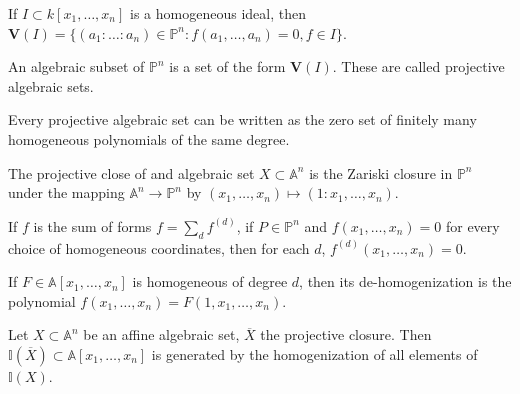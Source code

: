 \documentclass[crop=false,class=book,oneside]{standalone}
\begin{document}
                \begin{definition}
                    If $I\subset k[x_1,\hdots ,x_n]$ is a
                    homogeneous ideal, then
                    $\mathbf{V}(I)%
                     =\{(a_1:\hdots:a_{n})\in\mathbb{P}^{n}:%
                     f(a_{1},\hdots,a_{n})=0,f\in I\}$.
                \end{definition}
                \begin{definition}
                    An algebraic subset of $\mathbb{P}^{n}$ is a
                    set of the form $\mathbf{V}(I)$.
                    These are called projective algebraic sets.
                \end{definition}
                \begin{theorem}
                    Every projective algebraic set can be
                    written as the zero set of finitely many
                    homogeneous polynomials of the same degree.
                \end{theorem}
                \begin{definition}
                    The projective close of and algebraic set
                    $X\subset\mathbb{A}^n$ is the Zariski closure
                    in $\mathbb{P}^{n}$ under the mapping
                    $\mathbb{A}^{n}\rightarrow\mathbb{P}^n$
                    by $(x_{1},\hdots,x_{n})\mapsto(1:x_1,\hdots, x_n)$.
                \end{definition}
                \begin{theorem}
                    If $f$ is the sum of forms $f=\sum_{d}f^{(d)}$,
                    if $P\in \mathbb{P}^n$ and $f(x_1,\hdots, x_n)=0$
                    for every choice of homogeneous coordinates,
                    then for each $d$, $f^{(d)}(x_1,\hdots, x_n)=0$.
                \end{theorem}
                \begin{definition}
                    If $F\in \mathbb{A}[x_1,\hdots, x_n]$ is homogeneous
                    of degree $d$, then its de-homogenization is the
                    polynomial $f(x_1,\hdots, x_n)=F(1,x_1,\hdots, x_n)$.
                \end{definition}
                \begin{theorem}
                    Let $X\subset \mathbb{A}^n$ be an affine
                    algebraic set, $\overline{X}$ the projective closure. Then
                    $\mathbb{I}(\overline{X})\subset\mathbb{A}[x_1,\hdots,x_n]$
                    is generated by the homogenization of all
                    elements of $\mathbb{I}(X)$.
                \end{theorem}
\end{document}
